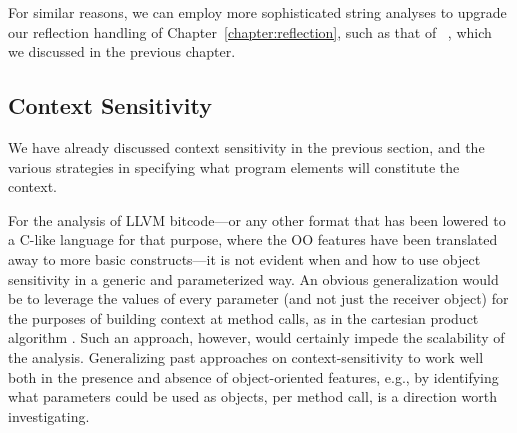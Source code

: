 For similar reasons, we can employ more sophisticated string analyses
to upgrade our reflection handling of
Chapter~\ref{chapter:reflection}, such as that of
\citeauthor*{sas/ChristensenMS03}~\cite{sas/ChristensenMS03}, which we
discussed in the previous chapter.


\subsection{Context Sensitivity}

We have already discussed context sensitivity in the previous section,
and the various strategies in specifying what program elements will
constitute the context.

For the analysis of LLVM bitcode---or any other format that has been
lowered to a C-like language for that purpose, where the OO features
have been translated away to more basic constructs---it is not evident
when and how to use object sensitivity in a generic and parameterized
way. An obvious generalization would be to leverage the values of
every parameter (and not just the receiver object) for the purposes of
building context at method calls, as in the cartesian product
algorithm \cite{Agesen:1995:CPA}. Such an approach, however, would
certainly impede the scalability of the analysis.
%
Generalizing past approaches on context-sensitivity to work well
both in the presence and absence of object-oriented features, e.g., by
identifying what parameters could be used as objects, per method call,
is a direction worth investigating.


